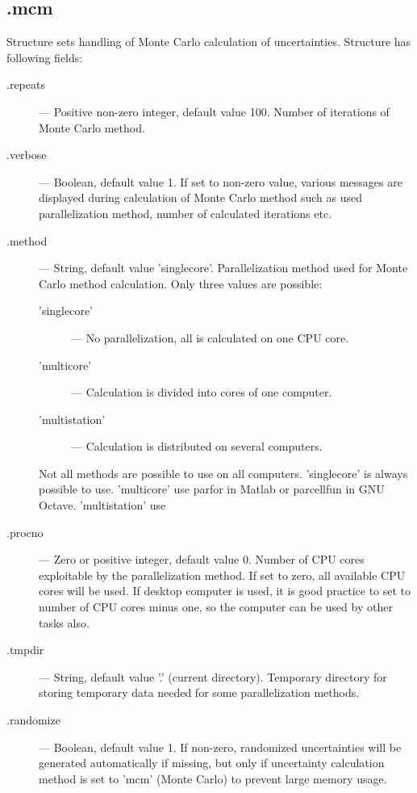 \documentclass[12pt]{article} %
\begin{document}
\subsection{\textsf{.mcm}} %
Structure sets handling of Monte Carlo calculation of uncertainties. Structure has following fields:
\begin{description}
        \item [\textsf{.repeats}] ---  Positive non-zero integer, default value 100. Number of iterations of Monte Carlo method.

        \item [\textsf{.verbose}] ---  Boolean, default value 1. If set to non-zero value, various messages
        are displayed during calculation of Monte Carlo method such as used parallelization method,
        number of calculated iterations etc.

        \item [\textsf{.method}] ---  String, default value 'singlecore'. Parallelization method used for Monte
        Carlo method calculation. Only three values are possible:
        \begin{description}
                \item [\textsf{'singlecore'}] ---  No parallelization, all is calculated on one CPU core.
                \item [\textsf{'multicore'}] ---  Calculation is divided into cores of one computer.
                \item [\textsf{'multistation'}] ---  Calculation is distributed on several computers.
        \end{description}
        Not all methods are possible to use on all computers. 'singlecore' is always possible to
        use. 'multicore' use parfor in Matlab or parcellfun in GNU Octave. 'multistation' use %

        \item [\textsf{.procno}] ---  Zero or positive integer, default value 0. Number of CPU cores exploitable
        by the parallelization method. If set to zero, all available CPU cores will be used. If
        desktop computer is used, it is good practice to set to number of CPU cores minus one, so
        the computer can be used by other tasks also. %

        \item [\textsf{.tmpdir}] ---  String, default value '.' (current directory). Temporary directory for
        storing temporary data needed for some parallelization methods. %

        \item [\textsf{.randomize}] ---  Boolean, default value 1. If non-zero, randomized uncertainties will be
        generated automatically if missing, but only if uncertainty calculation method is set to
        'mcm' (Monte Carlo) to prevent large memory usage.
\end{description}
\end{document}
